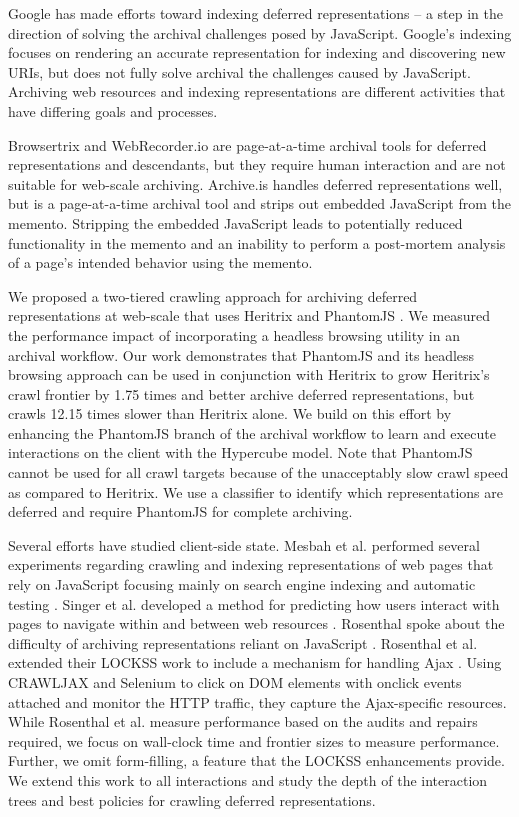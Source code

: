 \documentclass{sig-alternate}
\begin{document}
Google has made efforts toward indexing deferred representations \cite{googleJS} -- a step in the direction of solving the archival challenges posed by JavaScript. Google's indexing focuses on rendering an accurate representation for indexing and discovering new URIs, but does not fully solve archival the challenges caused by JavaScript. Archiving web resources and indexing representations are different activities that have differing goals and processes.

Browsertrix \cite{browsertrix} and WebRecorder.io \cite{webrecorder} are page-at-a-time archival tools for deferred representations and descendants, but they require human interaction and are not suitable for web-scale archiving. Archive.is \cite{archivetoday} handles deferred representations well, but is a page-at-a-time archival tool and strips out embedded JavaScript from the memento. Stripping the embedded JavaScript leads to potentially reduced functionality in the memento and an inability to perform a post-mortem analysis of a page's intended behavior using the memento.

We proposed a two-tiered crawling approach for archiving deferred representations at web-scale that uses Heritrix and PhantomJS \cite{crawlingDeferred}. We measured the performance impact of incorporating a headless browsing utility in an archival workflow. Our work demonstrates that PhantomJS \cite{pjs} and its headless browsing approach can be used in conjunction with Heritrix to grow Heritrix's crawl frontier by 1.75 times and better archive deferred representations, but crawls 12.15 times slower than Heritrix alone. We build on this effort by enhancing the PhantomJS branch of the archival workflow to learn and execute interactions on the client with the Hypercube model. Note that PhantomJS cannot be used for all crawl targets because of the unacceptably slow crawl speed as compared to Heritrix. We use a classifier to identify which representations are deferred and require PhantomJS for complete archiving. 

Several efforts have studied client-side state. Mesbah et al. performed several experiments regarding crawling and indexing representations of web pages that rely on JavaScript \cite{mesbahCrawling, mesbahInferState} focusing mainly on search engine indexing and automatic testing \cite{mesbahTesting, mesbah2}. Singer et al. developed a method for predicting how users interact with pages to navigate within and between web resources \cite{hyptrails}. Rosenthal spoke about the difficulty of archiving representations reliant on JavaScript \cite{iipc2013, futureWeb}. Rosenthal et al. extended their LOCKSS work to include a mechanism for handling Ajax \cite{dshrDlib}. Using CRAWLJAX and Selenium to click on DOM elements with onclick events attached and monitor the HTTP traffic, they capture the Ajax-specific resources. While Rosenthal et al. measure performance based on the audits and repairs required, we focus on wall-clock time and frontier sizes to measure performance. Further, we omit form-filling, a feature that the LOCKSS enhancements provide. We extend this work to all interactions and study the depth of the interaction trees and best policies for crawling deferred representations.
\end{document}
